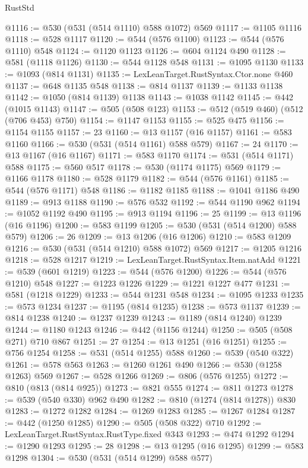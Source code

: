 \begin{lexlean}{RustStd}
\begin{coremodule}
{\begin{coremodule}
{{{{{{{{{{{{{{@1116 := @530 (@531 (@514 @1110) @588 @1072) @569
@1117 := @1105 @1116
@1118 := @528 @1117
@1120 := @544 (@576 @1100)
@1123 := @544 (@576 @1110) @548
@1124 := @1120 @1123
@1126 := @604 @1124 @490
@1128 := @581 (@1118 @1126)
@1130 := @544 @1128 @548
@1131 := @1095 @1130
@1133 := @1093 (@814 @1131)
@1135 := LexLeanTarget.RustSyntax.Ctor.none @460
@1137 := @648 @1135 @548
@1138 := @814 @1137
@1139 := @1133 @1138
@1142 := @1050 (@814 @1139) @1138
@1143 := @1038 @1142
@1145 := @442 (@1015 @1143)
@1147 := @505 (@508 @123)
@1153 := @512 (@519 @460) (@512 (@706 @453) @750)
@1154 := @1147 @1153
@1155 := @525 @475
@1156 := @1154 @1155
@1157 := 23
@1160 := @13 @1157 (@16 @1157)
@1161 := @583 @1160
@1166 := @530 (@531 (@514 @1161) @588 @579)
@1167 := 24
@1170 := @13 @1167 (@16 @1167)
@1171 := @583 @1170
@1174 := @531 (@514 @1171) @588
@1175 := @560 @517
@1178 := @530 (@1174 @1175) @569
@1179 := @1166 @1178
@1180 := @528 @1179
@1182 := @544 (@576 @1161)
@1185 := @544 (@576 @1171) @548
@1186 := @1182 @1185
@1188 := @1041 @1186 @490
@1189 := @913 @1188
@1190 := @576 @532
@1192 := @544 @1190 @962
@1194 := @1052 @1192 @490
@1195 := @913 @1194
@1196 := 25
@1199 := @13 @1196 (@16 @1196)
@1200 := @583 @1199
@1205 := @530 (@531 (@514 @1200) @588 @579)
@1206 := 26
@1209 := @13 @1206 (@16 @1206)
@1210 := @583 @1209
@1216 := @530 (@531 (@514 @1210) @588 @1072) @569
@1217 := @1205 @1216
@1218 := @528 @1217
@1219 := LexLeanTarget.RustSyntax.Item.natAdd
@1221 := @539 (@601 @1219)
@1223 := @544 (@576 @1200)
@1226 := @544 (@576 @1210) @548
@1227 := @1223 @1226
@1229 := @1221 @1227 @477
@1231 := @581 (@1218 @1229)
@1233 := @544 @1231 @548
@1234 := @1095 @1233
@1235 := @573 @1234
@1237 := @1195 (@814 @1235)
@1238 := @573 @1137
@1239 := @814 @1238
@1240 := @1237 @1239
@1243 := @1189 (@814 @1240) @1239
@1244 := @1180 @1243
@1246 := @442 (@1156 @1244)
@1250 := @505 (@508 @271) @710 @867
@1251 := 27
@1254 := @13 @1251 (@16 @1251)
@1255 := @756 @1254
@1258 := @531 (@514 @1255) @588
@1260 := @539 (@540 @322)
@1261 := @578 @563
@1263 := @1260 @1261 @490
@1266 := @530 (@1258 @1263) @569
@1267 := @528 @1266
@1269 := @806 (@576 @1255)
@1272 := @810 (@813 (@814 @925))
@1273 := @821 @555
@1274 := @811 @1273
@1278 := @539 (@540 @330) @962 @490
@1282 := @810 (@1274 (@814 @1278)) @830
@1283 := @1272 @1282
@1284 := @1269 @1283
@1285 := @1267 @1284
@1287 := @442 (@1250 @1285)
@1290 := @505 (@508 @322) @710
@1292 := LexLeanTarget.RustSyntax.RustType.fixed @343
@1293 := @474 @1292
@1294 := @1290 @1293
@1295 := 28
@1298 := @13 @1295 (@16 @1295)
@1299 := @583 @1298
@1304 := @530 (@531 (@514 @1299) @588 @577)
}}}}}}}}}}}}}}
\end{coremodule}}
\end{coremodule}
\end{lexlean}
